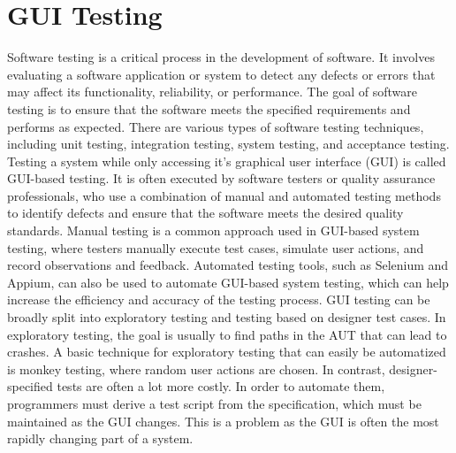\section{GUI Testing}
\label{sec:SecondContent:FirstSection}
Software testing is a critical process in the development of software. It involves evaluating a software application or system to detect any defects or errors that may affect its functionality, reliability, or performance. The goal of software testing is to ensure that the software meets the specified requirements and performs as expected. There are various types of software testing techniques, including unit testing, integration testing, system testing, and acceptance testing. Testing a system while only accessing it's graphical user interface (GUI) is called GUI-based testing. It is often executed by software testers or quality assurance professionals, who use a combination of manual and automated testing methods to identify defects and ensure that the software meets the desired quality standards. Manual testing is a common approach used in GUI-based system testing, where testers manually execute test cases, simulate user actions, and record observations and feedback. Automated testing tools, such as Selenium and Appium, can also be used to automate GUI-based system testing, which can help increase the efficiency and accuracy of the testing process.
GUI testing can be broadly split into exploratory testing and testing based on designer test cases. In exploratory testing, the goal is usually to find paths in the AUT that can lead to crashes. A basic technique for exploratory testing that can easily be automatized is monkey testing, where random user actions are chosen. In contrast, designer-specified tests are often a lot more costly. In order to automate them, programmers must derive a test script from the specification, which must be maintained as the GUI changes. This is a problem as the GUI is often the most rapidly changing part of a system.

